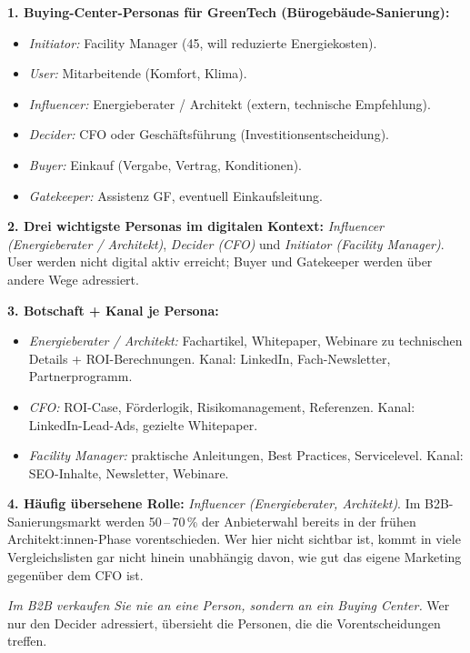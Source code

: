 \documentclass[11pt,a4paper,oneside]{article}
\begin{document}
\begin{loesungbox}
\textbf{1. Buying-Center-Personas für GreenTech (Bürogebäude-Sanierung):}
\begin{itemize}
  \item \emph{Initiator:} Facility Manager (45, will reduzierte Energiekosten).
  \item \emph{User:} Mitarbeitende (Komfort, Klima).
  \item \emph{Influencer:} Energieberater / Architekt (extern, technische Empfehlung).
  \item \emph{Decider:} CFO oder Geschäftsführung (Investitionsentscheidung).
  \item \emph{Buyer:} Einkauf (Vergabe, Vertrag, Konditionen).
  \item \emph{Gatekeeper:} Assistenz GF, eventuell Einkaufsleitung.
\end{itemize}

\textbf{2. Drei wichtigste Personas im digitalen Kontext:}
\emph{Influencer (Energieberater / Architekt)}, \emph{Decider (CFO)} und \emph{Initiator (Facility Manager)}. User werden nicht digital aktiv erreicht; Buyer und Gatekeeper werden über andere Wege adressiert.

\textbf{3. Botschaft + Kanal je Persona:}
\begin{itemize}
  \item \emph{Energieberater / Architekt:} Fachartikel, Whitepaper, Webinare zu technischen Details + ROI-Berechnungen. Kanal: LinkedIn, Fach-Newsletter, Partnerprogramm.
  \item \emph{CFO:} ROI-Case, Förderlogik, Risikomanagement, Referenzen. Kanal: LinkedIn-Lead-Ads, gezielte Whitepaper.
  \item \emph{Facility Manager:} praktische Anleitungen, Best Practices, Servicelevel. Kanal: SEO-Inhalte, Newsletter, Webinare.
\end{itemize}

\textbf{4. Häufig übersehene Rolle:}
\emph{Influencer (Energieberater, Architekt)}. Im B2B-Sanierungsmarkt werden 50\,--\,70\,\% der Anbieterwahl bereits in der frühen Architekt:innen-Phase vorentschieden. Wer hier nicht sichtbar ist, kommt in viele Vergleichslisten gar nicht hinein \textendash{} unabhängig davon, wie gut das eigene Marketing gegenüber dem CFO ist.

\begin{merkbox}
\emph{Im B2B verkaufen Sie nie an eine Person, sondern an ein Buying Center.} Wer nur den Decider adressiert, übersieht die Personen, die die Vorentscheidungen treffen.
\end{merkbox}
\end{loesungbox}
\end{document}
